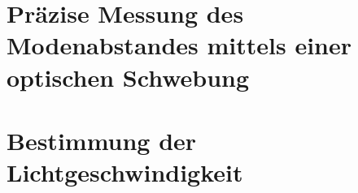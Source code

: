 \chapter{ Präzise Messung des Modenabstandes mittels einer
optischen Schwebung}

\chapter{Bestimmung der Lichtgeschwindigkeit}